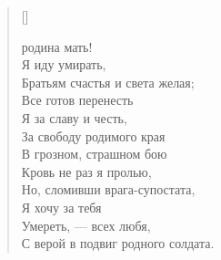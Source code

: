 \settowidth{\versewidth}{За свободу родимого края\ldotst}
\begin{verse}[\versewidth]
\begin{patverse*}
 родина мать!\\
    Я иду умирать,\\
Братьям счастья и света желая;\\
    Все готов перенесть\\
    Я за славу и честь,\\
За свободу родимого края\ldotst\\
    В грозном, страшном бою\\
    Кровь не раз я пролью,\\
Но, сломивши врага-супостата,\\
    Я хочу за тебя\\
    Умереть, --- всех любя,\\
С верой в подвиг родного солдата.
\end{patverse*}
\end{verse}

\newpage
\vspace*{0cm}


